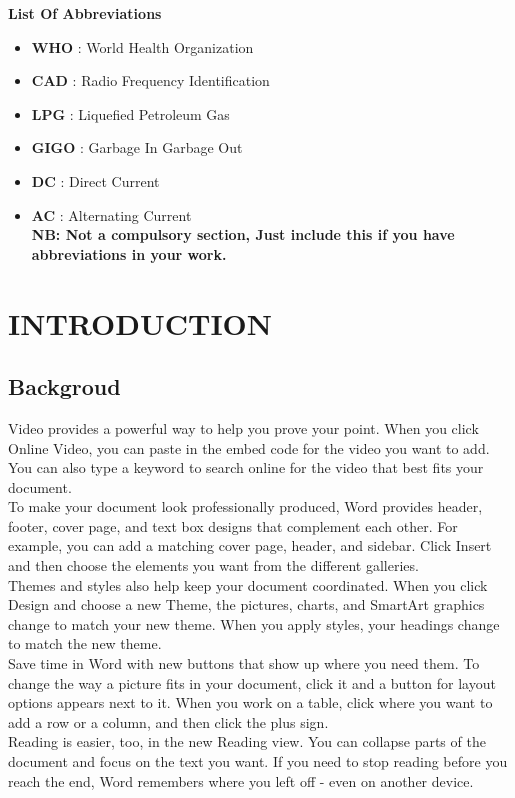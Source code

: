 \documentclass[12pt,a4paper]{report}
\begin{document}
\newpage
\begin{center}
 \LARGE\raggedright{\textbf{List Of Abbreviations}}
\end{center}
\vspace{0.2cm}
\begin{itemize}
  \item[]\textbf{WHO}  : World Health Organization
  \item[]\textbf{CAD}  : Radio Frequency Identification 
  \item[]\textbf{LPG}  : Liquefied Petroleum Gas
  \item[]\textbf{GIGO}  : Garbage In Garbage Out
  \item[]\textbf{DC}  : Direct Current
  \item[]\textbf{AC}  : Alternating Current\\
  \textbf{NB: Not a compulsory section, Just include this if you have abbreviations in your work.}
\end{itemize}

\vspace{0.5cm}
\begin{center}
  \end{center}

\newpage

\chapter{INTRODUCTION}
\section{Backgroud}
Video provides a powerful way to help you prove your point. When you click Online Video, you can paste in the embed code for the video you want to add. You can also type a keyword to search online for the video that best fits your document.\\
To make your document look professionally produced, Word provides header, footer, cover page, and text box designs that complement each other. For example, you can add a matching cover page, header, and sidebar. Click Insert and then choose the elements you want from the different galleries.\\
Themes and styles also help keep your document coordinated. When you click Design and choose a new Theme, the pictures, charts, and SmartArt graphics change to match your new theme. When you apply styles, your headings change to match the new theme.\\
Save time in Word with new buttons that show up where you need them. To change the way a picture fits in your document, click it and a button for layout options appears next to it. When you work on a table, click where you want to add a row or a column, and then click the plus sign.\\
Reading is easier, too, in the new Reading view. You can collapse parts of the document and focus on the text you want. If you need to stop reading before you reach the end, Word remembers where you left off - even on another device.
\end{document}
